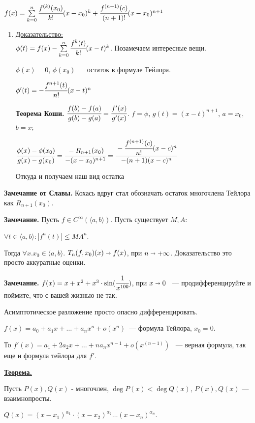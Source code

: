 \documentclass{article}
\newcommand{\thmm}[1]{\underline{\textbf{#1}}}
\newcommand{\prooff}[1]{{\underline{Доказательство:}} \\ }
\begin{document}
$f(x) = \sum\limits_{k=0}^n  \cfrac{f^{(k)}(x_0)}{k!}(x-x_0)^k + \cfrac{f^{(n+1)}(c)}{(n+1)!}(x-x_0)^{n+1} $
\begin{enumerate}
    \item[] \prooff{}

    $\phi(t) = f(x) - \sum\limits_{k=0}^n \cfrac{f^{k}(t)}{k!}(x-t)^k$. Позамечаем интересные вещи.

    $\phi(x) = 0$, $\phi(x_0) = $ остаток в формуле Тейлора.

    $\phi'(t) = - \cfrac{f^{n+1}(t)}{n!}(x-t)^n$

    \textbf{Теорема Коши.} $\cfrac{f(b)-f(a)}{g(b)-g(a) } = \cfrac{f'(x)}{g'(x)}$. $f = \phi$, $g(t) = (x-t)^{n+1}$, $a= x_0$, $b=x$;

    $\cfrac{\phi(x)-\phi(x_0)}{g(x)-g(x_0)} = \cfrac{-R_{n+1}(x_0)}{-(x-x_0)^{n+1}} = \cfrac{-\cfrac{f^{(n+1)}(c)}{n!} (x-c)^n}{-(n+1) (x-c)^n}$

    Откуда и получаем наш вид остатка
\end{enumerate}

\textbf{Замечание от Славы.} Кохась вдруг стал обозначать остаток многочлена Тейлора как $R_{n+1}(x_0)$.

\textbf{Замечание.} Пусть $f\in C^{\infty}(\langle a,b\rangle)$. Пусть существует $ M,A$:

$\forall t \in \langle a,b \rangle: |f^{n}(t)|\leq MA^n$.

Тогда $\forall x.x_0 \in \langle a,b\rangle$. $T_n(f,x_0)(x) \shortrightarrow f(x)$, при $n \shortrightarrow +\infty$. Доказательство это просто аккуратные оценки.

\textbf{Замечание.} $f(x) = x + x^2 + x^3 \cdot \sin(\cfrac{1}{x^{100}})$, при $x\shortrightarrow 0$ ~--- продифференцируйте и поймите, что с вашей жизнью не так.

Асимптотическое разложение просто опасно дифференцировать.

$f(x) = a_0+a_1x +\ldots +a_n x^n + o(x^n)$~--- формула Тейлора, $x_0=0$.

То $f'(x) = a_1+2a_2x + \ldots + n a_n x^{n-1} + o(x^{(n-1)})$ ~--- верная формула, так еще и формула тейлора для $f'$.

\thmm{Теорема.}

Пусть $P(x), Q(x) $ - многочлен, $\deg P(x) < \deg Q(x)$, $P(x),Q(x)$ --- взаимнопросты.

$Q(x) = (x-x_1)^{\alpha_1}\cdot (x-x_2)^{\alpha_2}\ldots(x-x_n)^{\alpha_n}$.
\end{document}
